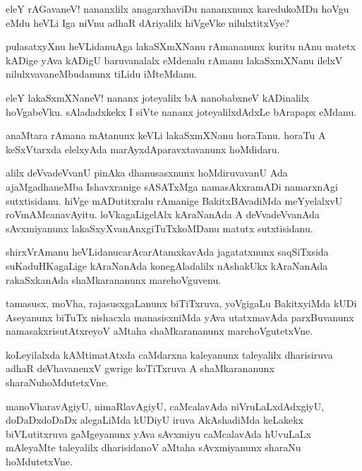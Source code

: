 \begin{mng}
eleY rAGavaneV! nananxlilx anagarxhaviDu nananxnunx karedukoMDu hoVgu eMdu heVLi Iga niVnu adhaR dAriyalilx hiVgeVke nilulxtitxVye?
\end{mng}

\begin{mng}
pulasatxyXnu heVLidanu\mdash Aga lakaSXmXNanu rAmananunx kuritu nAnu matetx kADige yAva kADigU baruvanalalx eMdenalu rAmanu lakaSxmXNanu ilelxV nilulxvavaneMbudanunx tiLidu iMteMdanu.
\end{mng}

\begin{mng}
eleY lakaSxmXNaneV! nananx joteyalilx bA nanobabxneV kADinalilx hoVgabeVku. sAladadxkekx I siVte nananx joteyalilxdAdxLe bArapapx eMdanu.
\end{mng}

\begin{mng}
anaMtara rAmana mAtanunx keVLi lakaSxmXNanu horaTanu. horaTu A keSxVtarxda elelxyAda marAyxdAparavxtavanunx hoMdidaru.
\end{mng}

\begin{mng}
alilx deVvadeVvanU pinAka dhanusasxnunx hoMdiruvavanU Ada ajaMgadhaneMba Ishavxranige sASATxMga namasAkxramADi namarxnAgi sutxtisidanu. hiVge mADutitxralu rAmanige BakitxBAvadiMda meYyelalxvU roVmAMcanavAyitu. loVkagaLigelAlx kAraNanAda A deVvadeVvanAda sAvxmiyanunx lakaSxyXvanAnxgiTuTxkoMDanu matutx sutxtisidanu.
\end{mng}

\begin{mng}
shirxVrAmanu heVLidanu\mdash carAcarAtamxkavAda jagatatxnunx saqSiTxsida suKaduHKagaLige kAraNanAda konegAladalilx nAshakUkx kAraNanAda rakaSxkanAda shaMkarananunx marehoVguvenu.
\end{mng}

\begin{mng}
tamasusx, moVha, rajasusxgaLanunx biTiTxruva, yoVgigaLu BakitxyiMda kUDi Aseyanunx biTuTx nishacxla manasisxniMda yAva utatxmavAda parxBuvanunx namasakxrisutAtxreyoV aMtaha shaMkarananunx marehoVgutetxVne.
\end{mng}

\begin{mng}
koLeyilalxda kAMtimatAtxda caMdarxna kaleyanunx taleyalilx dharisiruva adhaR deVhavanenxV gwrige koTiTxruva A shaMkarananunx sharaNuhoMdutetxVne.
\end{mng}

\begin{mng}
manoVharavAgiyU, nimaRlavAgiyU, caMcalavAda niVruLaLxdAdxgiyU, doDaDxdoDaDx alegaLiMda kUDiyU iruva AkAshadiMda keLakekx biVLutitxruva gaMgeyanunx yAva sAvxmiyu caMcalavAda hUvuLaLx mAleyaMte taleyalilx dharisidanoV aMtaha sAvxmiyanunx sharaNu hoMdutetxVne.
\end{mng}

